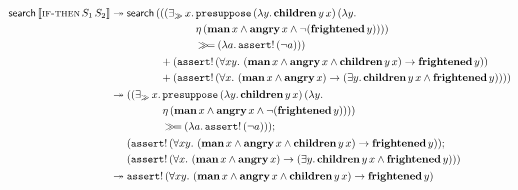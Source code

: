 \begin{align*}
  \textsf{search}\,\llbracket \textsc{if-then}\,S_1\,S_2 \rrbracket
  &\twoheadrightarrow \textsf{search}\,(\begin{aligned}[t]
     &((\mathop{\exists_\gg} x.\, \begin{aligned}[t]
         &\mathtt{presuppose}\,(\lambda y.\, \textbf{children}\,y\,x)\,(\lambda y.\,  \\
         &\eta\,(\textbf{man}\,x \land \textbf{angry}\,x \land \lnot (\textbf{frightened}\,y)))) \\
         &\mathbin{\gg\!=} (\lambda a.\, \mathtt{assert}!\,(\lnot a))) \\
       \end{aligned} \\
     &+ (\mathtt{assert}!\,(\forall x y.\ (\textbf{man}\,x \land \textbf{angry}\,x \land
                          \textbf{children}\,y\,x) \to \textbf{frightened}\,y)) \\
     &+ (\mathtt{assert}!\,(\forall x.\ (\textbf{man}\,x \land \textbf{angry}\,x) \to (\exists y.\, \textbf{children}\,y\,x \land \textbf{frightened}\,y))))
   \end{aligned} \\
  &\twoheadrightarrow \begin{aligned}[t]
     &((\mathop{\exists_\gg} x.\, \begin{aligned}[t]
         &\mathtt{presuppose}\,(\lambda y.\, \textbf{children}\,y\,x)\,(\lambda y.\,  \\
         &\eta\,(\textbf{man}\,x \land \textbf{angry}\,x \land \lnot (\textbf{frightened}\,y)))) \\
         &\mathbin{\gg\!=} (\lambda a.\, \mathtt{assert}!\,(\lnot a))); \\
       \end{aligned} \\
     &(\mathtt{assert}!\,(\forall x y.\ (\textbf{man}\,x \land \textbf{angry}\,x \land
                        \textbf{children}\,y\,x) \to \textbf{frightened}\,y)); \\
     &(\mathtt{assert}!\,(\forall x.\ (\textbf{man}\,x \land \textbf{angry}\,x) \to (\exists y.\, \textbf{children}\,y\,x \land \textbf{frightened}\,y)))
   \end{aligned} \\
  &\twoheadrightarrow \mathtt{assert}!\,(\forall x y.\ (\textbf{man}\,x \land \textbf{angry}\,x \land
                           \textbf{children}\,y\,x) \to \textbf{frightened}\,y)
\end{align*}


